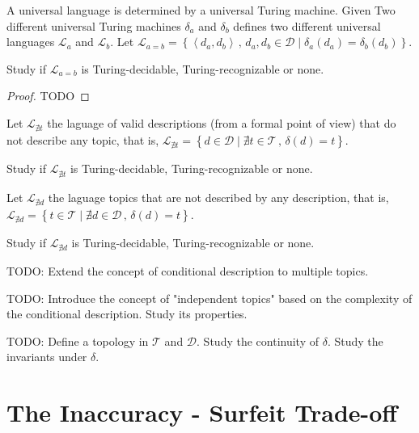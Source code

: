 A universal language is determined by a universal Turing machine. Given Two different universal Turing machines $\delta_{a}$ and $\delta_{b}$ defines two different universal languages $\mathcal{L}_{a}$ and $\mathcal{L}_{b}$. Let $\mathcal{L}_{a=b}=\left\{ \left\langle d_{a},d_{b}\right\rangle \,,\,d_{a},d_{b}\in\mathcal{D}\mid\delta_{a}\left(d_{a}\right)=\delta_{b}\left(d_{b}\right)\right\}$.

\begin{proposition}
Study if $\mathcal{L}_{a=b}$ is Turing-decidable, Turing-recognizable or none.
\end{proposition}
\begin{proof}
{\color{red} TODO}
\end{proof}

Let $\mathcal{L}_{\nexists t}$ the laguage of valid descriptions (from a formal point of view) that do not describe any topic, that is, $\mathcal{L}_{\nexists t}=\left\{ d\in\mathcal{D}\mid\nexists t\in\mathcal{T}\,,\,\delta\left(d\right)=t\right\}$.

\begin{proposition}
Study if $\mathcal{L}_{\nexists t}$ is Turing-decidable, Turing-recognizable or none.
\end{proposition}

Let $\mathcal{L}_{\nexists d}$ the laguage topics that are not described by any description, that is, $\mathcal{L}_{\nexists d}=\left\{ t\in\mathcal{T}\mid\nexists d\in\mathcal{D}\,,\,\delta\left(d\right)=t\right\}$.

\begin{proposition}
Study if $\mathcal{L}_{\nexists d}$ is Turing-decidable, Turing-recognizable or none.
\end{proposition}

{\color{red} TODO: Extend the concept of conditional description to multiple topics.}

{\color{red} TODO: Introduce the concept of "independent topics" based on the complexity of the conditional description. Study its properties.}

{\color{red} TODO: Define a topology in $\mathcal{T}$ and $\mathcal{D}$. Study the continuity of $\delta$. Study the invariants under $\delta$.}


%
%

\section{The Inaccuracy - Surfeit Trade-off}


